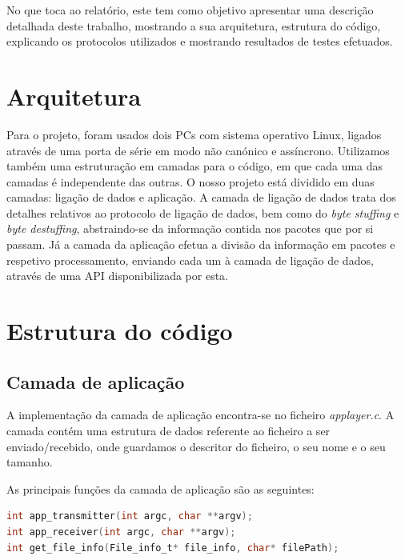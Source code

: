 \documentclass[11pt,a4paper,reqno]{article}
\numberwithin{equation}{section}
\begin{document}
No que toca ao relatório, este tem como objetivo apresentar uma descrição detalhada deste trabalho, mostrando a sua arquitetura, estrutura do código, explicando os protocolos utilizados e mostrando resultados de testes efetuados.

\section{Arquitetura}

Para o projeto, foram usados dois PCs com sistema operativo Linux, ligados através de uma porta de série em modo não canónico e assíncrono.
Utilizamos também uma estruturação em camadas para o código, em que cada uma das camadas é independente das outras. O nosso projeto está dividido em duas camadas: ligação de dados e aplicação. A camada de ligação de dados trata dos detalhes relativos ao protocolo de ligação de dados, bem como do \textit{byte stuffing} e \textit{byte destuffing}, abstraindo-se da informação contida nos pacotes que por si passam. Já a camada da aplicação efetua a divisão da informação em pacotes e respetivo processamento, enviando cada um à camada de ligação de dados, através de uma API disponibilizada por esta.

\section{Estrutura do código}

\subsection{Camada de aplicação}

A implementação da camada de aplicação encontra-se no ficheiro \textit{applayer.c}. A camada contém uma estrutura de dados referente ao ficheiro a ser enviado/recebido, onde guardamos o descritor do ficheiro, o seu nome e o seu tamanho.



As principais funções da camada de aplicação são as seguintes:

\begin{lstlisting}[language=C]
int app_transmitter(int argc, char **argv);
int app_receiver(int argc, char **argv);
int get_file_info(File_info_t* file_info, char* filePath);
\end{lstlisting}
\end{document}
